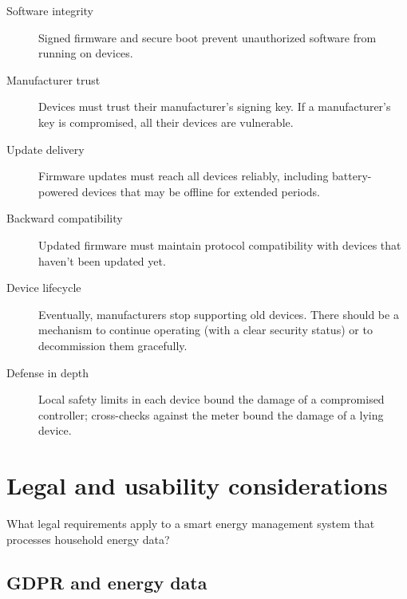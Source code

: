 \begin{description}
  \item[Software integrity] Signed firmware and secure boot prevent
    unauthorized software from running on devices.
  \item[Manufacturer trust] Devices must trust their manufacturer's
    signing key.
    If a manufacturer's key is compromised, all their devices are
    vulnerable.
  \item[Update delivery] Firmware updates must reach all devices reliably,
    including battery-powered devices that may be offline for extended
    periods.
  \item[Backward compatibility] Updated firmware must maintain protocol
    compatibility with devices that haven't been updated yet.
  \item[Device lifecycle] Eventually, manufacturers stop supporting old
    devices.
    There should be a mechanism to continue operating (with a clear
    security status) or to decommission them gracefully.
  \item[Defense in depth] Local safety limits in each device bound the
    damage of a compromised controller; cross-checks against the meter
    bound the damage of a lying device.
\end{description}


\section{Legal and usability considerations}\label{EnergyLegalUsability}


\begin{exercise}
  What legal requirements apply to a smart energy management system that
  processes household energy data?
\end{exercise}

\subsection{GDPR and energy data}

